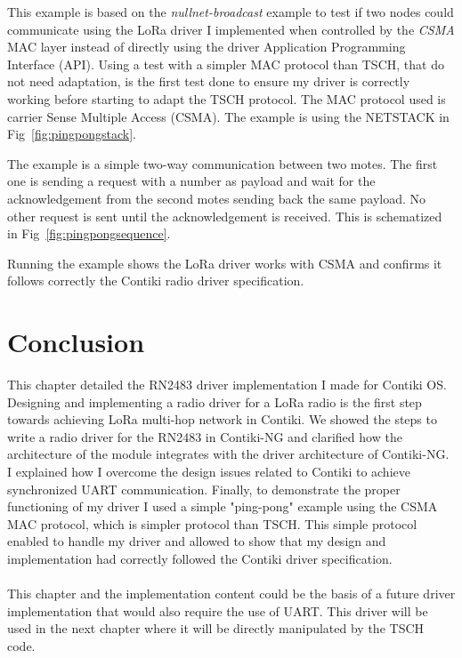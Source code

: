 This example is based on the \emph{nullnet-broadcast} example to test if two
nodes could communicate using the LoRa driver I implemented when controlled by
the \emph{CSMA} MAC layer instead of directly using the driver Application Programming Interface (API)\@.
Using a test with a simpler MAC protocol than TSCH, that do not need adaptation,
is the first test done to ensure my driver is correctly working before starting to adapt
the TSCH protocol.
The MAC protocol used is carrier Sense Multiple Access (CSMA).
The example is using the NETSTACK in Fig~\ref{fig:pingpongstack}.



The example is a simple two-way communication between two motes.
The first one is sending a request with a number as
payload and wait for the acknowledgement from the second motes sending back
the same payload.
No other request is sent until the acknowledgement is received.
This is schematized in Fig~\ref{fig:pingpongsequence}.



Running the example shows the LoRa driver works with CSMA and confirms
it follows correctly the Contiki radio driver specification.

\section{Conclusion}

This chapter detailed the RN2483 driver implementation I made for Contiki OS.
Designing and implementing a radio driver for a LoRa radio is the first step towards achieving LoRa
multi-hop network in Contiki.
We showed the steps to write a radio driver for the RN2483 in Contiki-NG and clarified how
the architecture of the module integrates with the driver architecture of Contiki-NG.
I explained how I overcome the design issues related to Contiki to achieve
synchronized UART communication.
Finally, to demonstrate the proper functioning of my driver I used a simple "ping-pong" example
using the CSMA MAC protocol, which is simpler protocol than TSCH.
This simple protocol enabled to handle my
driver and allowed to show that my design and implementation had correctly followed the Contiki driver
specification.

\paragraph{}

This chapter and the implementation content could be the basis of a future
driver implementation that would also require the use of UART.
This driver will be used in the next chapter where it will be directly
manipulated by the TSCH code.

